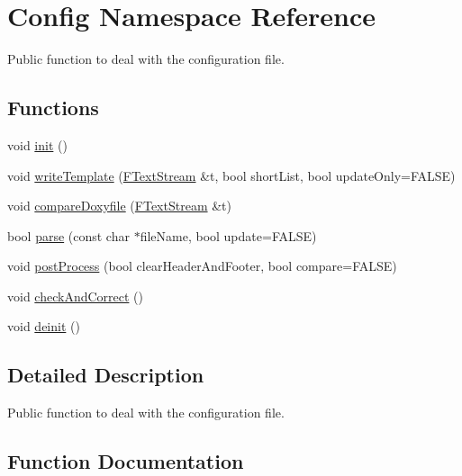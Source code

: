 \hypertarget{namespace_config}{}\section{Config Namespace Reference}
\label{namespace_config}


Public function to deal with the configuration file.  


\subsection*{Functions}
\begin{DoxyCompactItemize}
\item 
void \mbox{\hyperlink{namespace_config_a91bcb187ed95ec673137e413a4d77203}{init}} ()
\item 
void \mbox{\hyperlink{namespace_config_ad762288cc87bc2cfc411ce419a4453f5}{write\+Template}} (\mbox{\hyperlink{class_f_text_stream}{F\+Text\+Stream}} \&t, bool short\+List, bool update\+Only=F\+A\+L\+SE)
\item 
void \mbox{\hyperlink{namespace_config_a27aded81204a4486717dcb65efb8f988}{compare\+Doxyfile}} (\mbox{\hyperlink{class_f_text_stream}{F\+Text\+Stream}} \&t)
\item 
bool \mbox{\hyperlink{namespace_config_a0a4bebb4ccf9e25679204573753f1a15}{parse}} (const char $\ast$file\+Name, bool update=F\+A\+L\+SE)
\item 
void \mbox{\hyperlink{namespace_config_a8cfddad5eb7c03beb96eddf1e78779db}{post\+Process}} (bool clear\+Header\+And\+Footer, bool compare=F\+A\+L\+SE)
\item 
void \mbox{\hyperlink{namespace_config_a151a6e9239fe223bebe4eb2d211fb543}{check\+And\+Correct}} ()
\item 
void \mbox{\hyperlink{namespace_config_a7b3346b2e70cc73d231d540df5d67e57}{deinit}} ()
\end{DoxyCompactItemize}


\subsection{Detailed Description}
Public function to deal with the configuration file. 

\subsection{Function Documentation}
\mbox{\label{namespace_config_a151a6e9239fe223bebe4eb2d211fb543}} 
